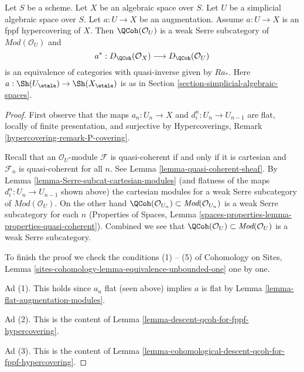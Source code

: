 \begin{lemma}
\label{lemma-coh-descent-qcoh-unbounded-for-fppf-hypercovering}
Let $S$ be a scheme. Let $X$ be an algebraic space over $S$.
Let $U$ be a simplicial algebraic space over $S$. Let $a : U \to X$
be an augmentation. Assume $a : U \to X$ is an fppf hypercovering of $X$.
Then $\QCoh(\mathcal{O}_U)$ is a weak Serre subcategory of
$\textit{Mod}(\mathcal{O}_U)$ and
$$
a^* : D_\QCoh(\mathcal{O}_X) \longrightarrow D_\QCoh(\mathcal{O}_U)
$$
is an equivalence of categories with quasi-inverse given by
$Ra_*$. Here $a : \Sh(U_\etale) \to \Sh(X_\etale)$
is as in Section \ref{section-simplicial-algebraic-spaces}.
\end{lemma}

\begin{proof}
First observe that the maps $a_n : U_n \to X$ and $d^n_i : U_n \to U_{n - 1}$
are flat, locally of finite presentation, and surjective by
Hypercoverings, Remark \ref{hypercovering-remark-P-covering}.

\medskip\noindent
Recall that an $\mathcal{O}_U$-module $\mathcal{F}$ is quasi-coherent if and
only if it is cartesian and $\mathcal{F}_n$ is quasi-coherent for all $n$.
See Lemma \ref{lemma-quasi-coherent-sheaf}.
By Lemma \ref{lemma-Serre-subcat-cartesian-modules}
(and flatness of the maps $d^n_i : U_n \to U_{n - 1}$ shown above)
the cartesian modules for a weak Serre subcategory of
$\textit{Mod}(\mathcal{O}_U)$. On the other hand
$\QCoh(\mathcal{O}_{U_n}) \subset \textit{Mod}(\mathcal{O}_{U_n})$
is a weak Serre subcategory for each $n$
(Properties of Spaces, Lemma
\ref{spaces-properties-lemma-properties-quasi-coherent}).
Combined we see that
$\QCoh(\mathcal{O}_U) \subset \textit{Mod}(\mathcal{O}_U)$
is a weak Serre subcategory.

\medskip\noindent
To finish the proof we check the conditions (1) -- (5) of
Cohomology on Sites, Lemma
\ref{sites-cohomology-lemma-equivalence-unbounded-one} one by one.

\medskip\noindent
Ad (1). This holds since $a_n$ flat (seen above) implies $a$ is flat
by Lemma \ref{lemma-flat-augmentation-modules}.

\medskip\noindent
Ad (2). This is the content of
Lemma \ref{lemma-descent-qcoh-for-fppf-hypercovering}.

\medskip\noindent
Ad (3). This is the content of
Lemma \ref{lemma-cohomological-descent-qcoh-for-fppf-hypercovering}.


\end{proof}
